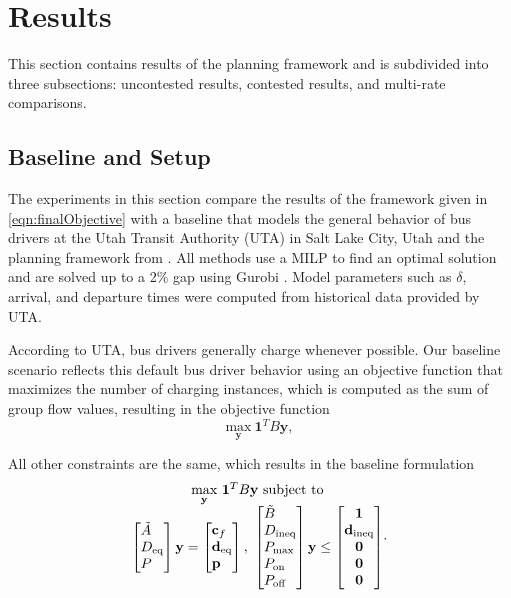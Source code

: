 \section{Results}
This section contains results of the planning framework and is subdivided into three subsections: uncontested results, contested results, and multi-rate comparisons.  
\subsection{\label{sec:setup} Baseline and Setup}
The experiments in this section compare the results of the framework given in \eqref{eqn:finalObjective} with a baseline that models the general behavior of bus drivers at the Utah Transit Authority (UTA) in Salt Lake City, Utah and the planning framework from \cite{He_2022_Battery}. All methods use a MILP to find an optimal solution and are solved up to a 2\% gap using Gurobi \cite{gurobi}. Model parameters such as $\delta$, arrival, and departure times were computed from historical data provided by UTA.
\par According to UTA, bus drivers generally charge whenever possible. Our baseline scenario reflects this default bus driver behavior using an objective function that maximizes the number of charging instances, which is computed as the sum of group flow values, resulting in the objective function
\begin{equation}
	\underset{\mathbf{y}}{\text{max}} \ \mathbf{1}^TB\mathbf{y},
\end{equation}
\par All other constraints are the same, which results in the baseline formulation 
\begin{equation}\label{eqn:finalBaselineObjective}
	\begin{matrix*}[c]
		\underset{\mathbf{y}}{\scalebox{1}{\text{max}}} \ \mathbf{1}^TB\mathbf{y} \ \text{subject to}\\
		\begin{bmatrix*}[l]
				\tilde{A} \\
				D_{\text{eq}} \\
				P
				\end{bmatrix*} \mathbf{y} = \begin{bmatrix*}[l]\mathbf{c}_f \\ \mathbf{d}_{\text{eq}}\\\mathbf{p} \end{bmatrix*}, \ \begin{bmatrix*}[l]
			\tilde{B} \\
			D_{\text{ineq}} \\ 
			P_{\text{max}} \\
			P_{\text{on}} \\
			P_{\text{off}}
			\end{bmatrix*}\mathbf{y} \le \begin{bmatrix*}\mathbf{1} \\ \mathbf{d}_{\text{ineq}} \\ \mathbf{0} \\ \mathbf{0} \\ \mathbf{0} \end{bmatrix*}
	\end{matrix*}.
\end{equation}
